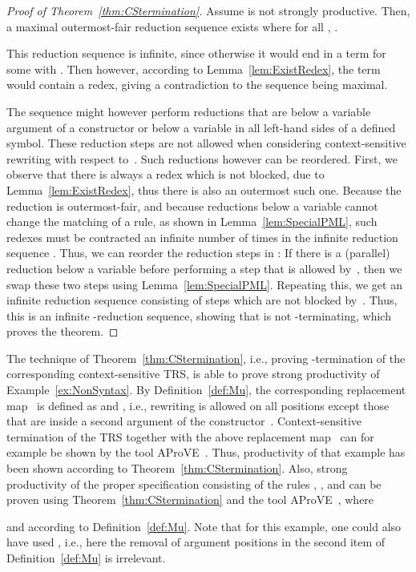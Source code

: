 \documentclass{eptcs}
\begin{document}
\begin{proof}[Proof of Theorem~\ref{thm:CStermination}]
Assume  is not strongly productive.
Then, a maximal outermost-fair reduction sequence
 exists where for all
, .

This reduction sequence is infinite, since otherwise it would end in a term
 for some  with . Then however, according
to Lemma~\ref{lem:ExistRedex}, the term  would contain a redex, giving a
contradiction to the sequence being maximal.

The sequence might however perform reductions that are below a variable argument
of a constructor or below a variable in all left-hand sides of a defined symbol.
These reduction steps are not allowed when considering context-sensitive
rewriting with respect to~. Such reductions however can be reordered.
First, we observe that there is always a redex which is not blocked, due to 
Lemma~\ref{lem:ExistRedex}, thus there is also an outermost such one. Because
the reduction is outermost-fair, and because reductions below a variable cannot
change the matching of a rule, as shown in Lemma~\ref{lem:SpecialPML}, such
redexes must be contracted an infinite number of times in the infinite reduction
sequence . Thus, we can reorder the reduction steps in :
If there is a (parallel) reduction below a variable before performing a step
that is allowed by~, then we swap these two steps using
Lemma~\ref{lem:SpecialPML}. Repeating this, we get an infinite reduction
sequence  consisting of steps which are not blocked by~. Thus, this
is an infinite -reduction sequence, showing that  is not
-terminating, which proves the theorem.
\end{proof}

The technique of Theorem~\ref{thm:CStermination}, i.e., proving
-termination of the corresponding context-sensitive TRS, is able to prove
strong productivity of Example~\ref{ex:NonSyntax}. By Definition~\ref{def:Mu},
the corresponding replacement map~ is defined as
 and
, i.e., rewriting is allowed on all
positions except those that are inside a second argument of the
constructor~.
Context-sensitive termination of the TRS together with the above replacement
map~ can for example be shown by the tool AProVE~\cite{AProVE06}.
Thus, productivity of that example has been shown according to
Theorem~\ref{thm:CStermination}.
Also, strong productivity of the proper specification consisting of the rules
,
, and 
can be proven using Theorem~\ref{thm:CStermination} and the tool
AProVE~\cite{AProVE06}, where

and 
according to Definition~\ref{def:Mu}.
Note that for this example, one could also have used ,
i.e., here the removal of argument positions in the second item of
Definition~\ref{def:Mu} is irrelevant.
\end{document}
